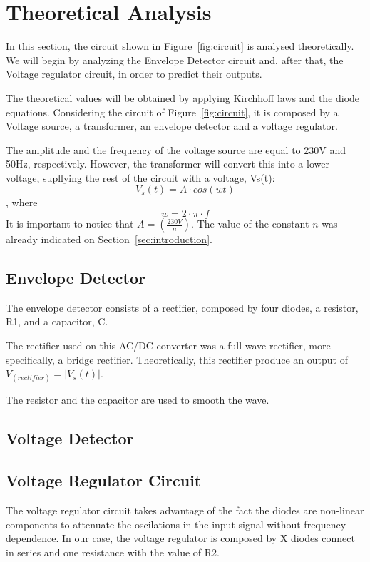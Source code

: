 \section{Theoretical Analysis}
\label{sec:analysis}

In this section, the circuit shown in Figure~\ref{fig:circuit} is analysed
theoretically. We will begin by analyzing the Envelope Detector circuit and, after that, the Voltage regulator circuit, in order to predict their outputs.

The theoretical values will be obtained by applying Kirchhoff laws and the diode equations.
Considering the circuit of Figure~\ref{fig:circuit}, it is composed by a Voltage source, a transformer, an envelope detector and a voltage regulator.

The amplitude and the frequency of the voltage source are equal to 230V and 50Hz, respectively. However, the transformer will convert this into a lower voltage, supllying the rest of the circuit with a voltage, Vs(t):
\begin{equation}
  V_s(t)= A \cdot cos(wt)
  \label{eq:Vs(t)}
\end{equation}
, where
\begin{equation}
  w= 2 \cdot \pi \cdot f
  \label{eq:Vs(t)}
\end{equation}
It is important to notice that $A=(\frac{230V}{n})$. The value of the constant $n$ was already indicated on Section~\ref{sec:introduction}.

\subsection{Envelope Detector}
The envelope detector consists of a rectifier, composed by four diodes, a resistor, R1, and a capacitor, C.

The rectifier used on this AC/DC converter was a full-wave rectifier, more specifically, a bridge rectifier. Theoretically, this rectifier produce an output of $V_(rectifier)=|V_s(t)|$.

The resistor and the capacitor are used to smooth the wave.


\subsection{Voltage Detector}

\subsection{Voltage Regulator Circuit}
The voltage regulator circuit takes advantage of the fact the diodes are non-linear components to attenuate the oscilations in the input signal without frequency dependence. In our case, the voltage regulator is composed by X diodes connect in series and one resistance with the value of R2.\\

